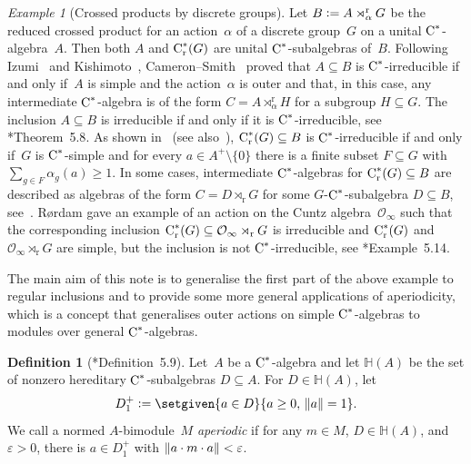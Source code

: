 \documentclass[a4paper]{amsart}
\theoremstyle{plain}
\theoremstyle{definition}
\newtheorem{definition}[theorem]{Definition}
\theoremstyle{remark}
\newtheorem{example}[theorem]{Example}
\numberwithin{theorem}{section}
\numberwithin{equation}{section}
\newcommand{\Her}{\mathbb H}%
\newcommand*{\nb}{\nobreakdash}
\newcommand*{\red}{\mathrm{r}}%
\newcommand*{\Cst}{\textup C^*}%
\newcommand*{\defeq}{\mathrel{\vcentcolon=}}%
\DeclarePairedDelimiter{\norm}{\lVert}{\rVert}%
\begin{document}
\begin{example}[Crossed products by discrete groups]
  \label{ex:crossed_product_inclusions}
  Let \(B\defeq A\rtimes^\red_\alpha G\) be the reduced crossed
  product for an action~\(\alpha\) of a discrete group~\(G\) on a
  unital \(\Cst\)\nb-algebra~\(A\).
  Then both \(A\) and \(\Cst_\red(G)\) are unital
  \(\Cst\)\nb-subalgebras of~\(B\).
  Following Izumi~\cite{Izumi:Inclusions_simple} and
  Kishimoto~\cite{Kishimoto:Outer_crossed},
  Cameron--Smith~\cite{Cameron-Smith:Galois_reduced} proved that
  \(A\subseteq B\) is \(\Cst\)\nb-irreducible if and only if~\(A\) is
  simple and the action~\(\alpha\) is outer and that, in this case,
  any intermediate \(\Cst\)\nb-algebra is of the form
  \(C=A\rtimes^\red_\alpha H\) for a subgroup \(H\subseteq G\).
  The inclusion \(A\subseteq B\) is irreducible if and only if it is
  \(\Cst\)\nb-irreducible, see
  \cite{Rordam:Irreducible_inclusions}*{Theorem~5.8}.
  As shown in~\cite{Rordam:Irreducible_inclusions} (see
  also~\cite{Amrutam_Kalantar:Simplicity_intermediate}),
  \(\Cst_\red(G)\subseteq B\) is \(\Cst\)\nb-irreducible if and only
  if~\(G\) is \(\Cst\)\nb-simple and for every \(a\in
  A^+\setminus\{0\}\) there is a finite subset \(F\subseteq G\) with
  \(\sum_{g\in F} \alpha_g(a)\ge 1\).
  In some cases, intermediate \(\Cst\)\nb-algebras for
  \(\Cst_\red(G)\subseteq B\) are described as algebras of the form
  \(C=D\rtimes_\red G\) for some \(G\)-\(\Cst\)\nb-subalgebra
  \(D\subseteq B\), see~\cite{Amrutam:Intermediate_subalgebras}.
  Rørdam gave an example of an action on the Cuntz
  algebra~\(\mathcal{O}_\infty\) such that the corresponding
  inclusion \(\Cst_\red(G)\subseteq
  \mathcal{O}_\infty\rtimes_\red G\) is irreducible and
  \(\Cst_\red(G)\) and \(\mathcal{O}_\infty\rtimes_\red G\) are
  simple, but the inclusion is not \(\Cst\)\nb-irreducible, see
  \cite{Rordam:Irreducible_inclusions}*{Example~5.14}.
\end{example}

The main aim of this note is to generalise the first part of the above
example to regular inclusions and to provide some more general
applications of aperiodicity, which is a concept that generalises
outer actions on simple \(\Cst\)\nb-algebras to modules over general
\(\Cst\)\nb-algebras.

\begin{definition}[{\cite{Kwasniewski-Meyer:Essential}*{Definition~5.9}}]
  \label{def:aperiodic_bimodule}%
  Let~\(A\) be a \(\Cst\)\nb-algebra and let \(\Her(A)\) be the set of
  nonzero hereditary \(\Cst\)\nb-subalgebras \(D\subseteq A\).
  For \(D\in\Her(A)\), let
  \[
    D^+_1 \defeq \setgiven{a\in D}{a\ge 0,\, \norm{a}=1}.
  \]
  We call a normed \(A\)\nb-bimodule~\(M\) \emph{aperiodic} if for any
  \(m\in M\), \(D\in \Her(A)\), and \(\varepsilon>0\), there is \(a\in
  D^+_1\) with \(\norm{a \cdot m\cdot a}<\varepsilon\).
\end{definition}
\end{document}
